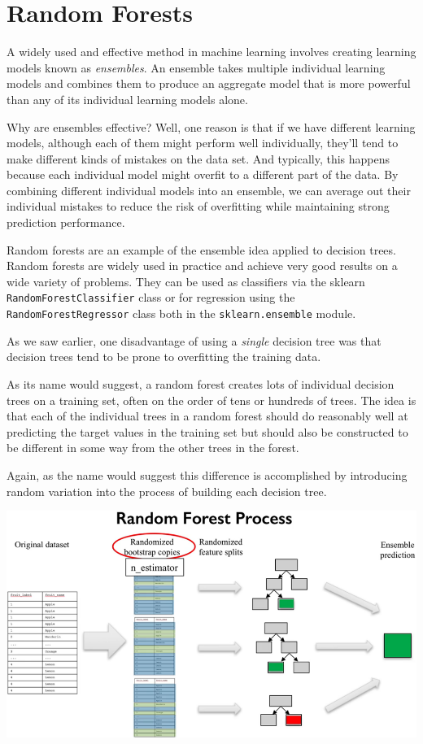 \section{Random Forests}

A widely used and effective method in machine learning involves creating learning models known as \emph{ensembles}. An ensemble takes multiple individual learning models and combines them to produce an aggregate model that is more powerful than any of its individual learning models alone. 

Why are ensembles effective? Well, one reason is that if we have different learning models, although each of them might perform well individually, they'll tend to make different kinds of mistakes on the data set. And typically, this happens because each individual model might overfit to a different part of the data. By combining different individual models into an ensemble, we can average out their individual mistakes to reduce the risk of overfitting while maintaining strong prediction performance. 

Random forests are an example of the ensemble idea applied to decision trees. Random forests are widely used in practice and achieve very good results on a wide variety of problems. They can be used as classifiers via the sklearn \texttt{RandomForestClassifier} class or for regression using the \texttt{RandomForestRegressor} class both in the \texttt{sklearn.ensemble} module. 

As we saw earlier, one disadvantage of using a \emph{single} decision tree was that decision trees tend to be prone to overfitting the training data. 

As its name would suggest, a random forest creates lots of individual decision trees on a training set, often on the order of tens or hundreds of trees. The idea is that each of the individual trees in a random forest should do reasonably well at predicting the target values in the training set but should also be constructed to be different in some way from the other trees in the forest. 

Again, as the name would suggest this difference is accomplished by introducing random variation into the process of building each decision tree. 

\begin{center}
	\includegraphics[width=\linewidth]{img/Random-Forest-Process.png} 
\end{center}


